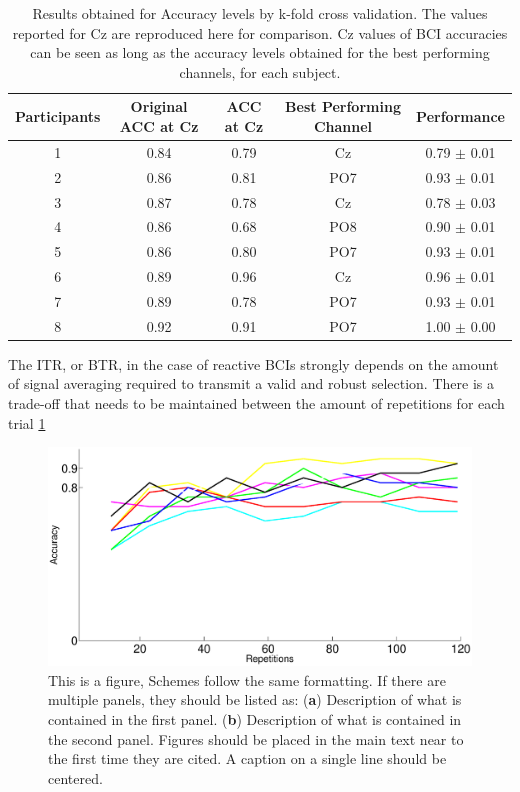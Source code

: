 \documentclass[entropy,article,submit,moreauthors,pdftex,10pt,a4paper]{mdpi}
\begin{document}
\begin{table}[H]
\caption{Results obtained for Accuracy levels by k-fold cross validation. The values reported for Cz are reproduced here for comparison. Cz values of BCI accuracies can be seen as long as the accuracy levels obtained for the best performing channels, for each subject.}
\centering
\begin{tabular}{ccccc}
\toprule
\textbf{Participants}	& \textbf{Original ACC at Cz}	& \textbf{ACC at Cz}	& \textbf{Best Performing Channel}	& \textbf{Performance}\\
\midrule
1     &   0.84 &   0.79 & Cz  &   0.79 $\pm$ 0.01 \\
2     &   0.86 &   0.81 & PO7 &   0.93 $\pm$ 0.01 \\
3     &   0.87 &   0.78 & Cz  &   0.78 $\pm$ 0.03 \\
4     &   0.86 &   0.68 & PO8 &   0.90 $\pm$ 0.01 \\
5     &   0.86 &   0.80 & PO7 &   0.93 $\pm$ 0.01 \\
6     &   0.89 &   0.96 & Cz  &   0.96 $\pm$ 0.01 \\
7     &   0.89 &   0.78 & PO7 &   0.93 $\pm$ 0.01 \\
8     &   0.92 &   0.91 & PO7 &   1.00 $\pm$ 0.00 \\
\bottomrule
\end{tabular}
\label{tab:results}
\end{table}

The ITR, or BTR, in the case of reactive BCIs \citep{WolpawJonathanR2012} strongly depends on the amount of signal averaging required to transmit a valid and robust selection.  There is a trade-off that needs to be maintained between the amount of repetitions for each trial  \ref{fig:singletrial}


\begin{figure}[H]
\centering
\includegraphics[width=16cm]{singletriality.eps}
\caption{This is a figure, Schemes follow the same formatting. If there are multiple panels, they should be listed as: (\textbf{a}) Description of what is contained in the first panel. (\textbf{b}) Description of what is contained in the second panel. Figures should be placed in the main text near to the first time they are cited. A caption on a single line should be centered.}
\label{fig:singletrial}
\end{figure}
\end{document}
